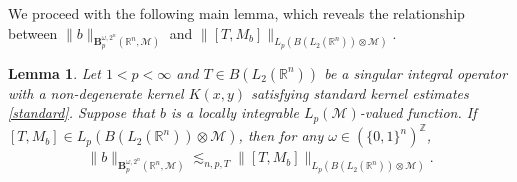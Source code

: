 \documentclass[oneside,english,a4wide]{amsart}
\numberwithin{equation}{section}
\numberwithin{figure}{section}
\theoremstyle{plain}
\theoremstyle{plain}
\theoremstyle{definition}
\theoremstyle{plain}
\newtheorem{lemma}[thm]{Lemma}
\theoremstyle{remark}
\theoremstyle{definition}
\theoremstyle{remark}
\theoremstyle{definition}
\newcommand{\8}{\infty}
\begin{document}
We proceed with the following main lemma, which reveals the relationship between $\|b\|_{\pmb{B}_p^{\omega,2^n}(\mathbb{R}^n,\mathcal{M})}$ and $\|[T,M_b]\|_{L_p(B(L_2(\mathbb{R}^n))\otimes \mathcal{M})}$.

\begin{lemma}\label{nonconv1}
	Let $1<p<\infty$ and $T\in B(L_2(\mathbb{R}^n))$ be a singular integral operator with a non-degenerate kernel $K(x,y)$ satisfying standard kernel estimates \eqref{standard}. Suppose that $b$ is a locally integrable $L_p(\mathcal{M})$-valued function. If $[T,M_b]\in L_p(B(L_2(\mathbb{R}^n))\otimes \mathcal{M})$, then for any $\omega\in(\{0,1\}^n)^\mathbb{Z}$,
	\begin{equation*}
		\begin{aligned}
			\|b\|_{\pmb{B}_p^{\omega,2^n}(\mathbb{R}^n,\mathcal{M})}\lesssim_{n,p,T}\|[T,M_b]\|_{L_p(B(L_2(\mathbb{R}^n))\otimes \mathcal{M})}.
		\end{aligned}
	\end{equation*}	
\end{lemma}	
\end{document}
